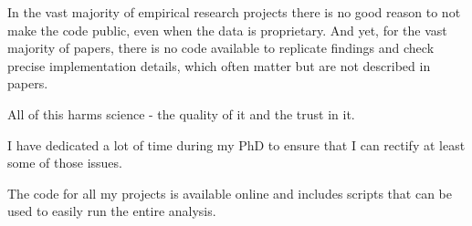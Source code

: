 In the vast majority of empirical research projects there is no good reason to
not make the code public, even when the data is proprietary. And yet, for the
vast majority of papers, there is no code available to replicate findings and
check precise implementation details, which often matter but are not described
in papers.

All of this harms science - the quality of it and the trust in it.

I have dedicated a lot of time during my PhD to ensure that I can rectify at
least some of those issues.

The code for all my projects is available online and includes scripts that can
be used to easily run the entire analysis.

